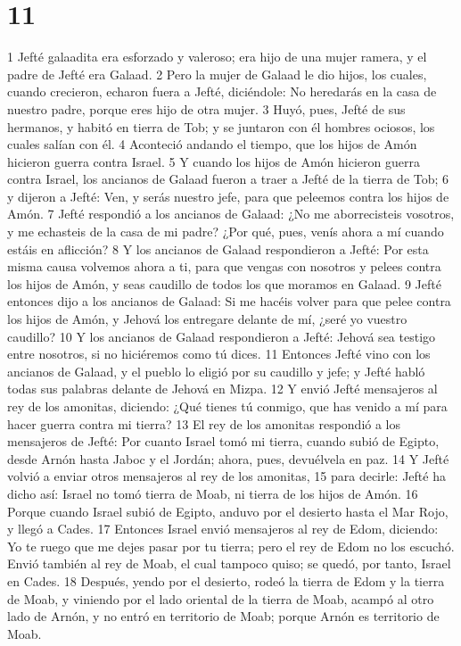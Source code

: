 \chapter{11}


1 Jefté galaadita era esforzado y valeroso; era hijo de una mujer ramera, y el padre de Jefté era Galaad.
2 Pero la mujer de Galaad le dio hijos, los cuales, cuando crecieron, echaron fuera a Jefté, diciéndole: No heredarás en la casa de nuestro padre, porque eres hijo de otra mujer.
3 Huyó, pues, Jefté de sus hermanos, y habitó en tierra de Tob; y se juntaron con él hombres ociosos, los cuales salían con él.
4 Aconteció andando el tiempo, que los hijos de Amón hicieron guerra contra Israel.
5 Y cuando los hijos de Amón hicieron guerra contra Israel, los ancianos de Galaad fueron a traer a Jefté de la tierra de Tob; 
6 y dijeron a Jefté: Ven, y serás nuestro jefe, para que peleemos contra los hijos de Amón.
7 Jefté respondió a los ancianos de Galaad: ¿No me aborrecisteis vosotros, y me echasteis de la casa de mi padre? ¿Por qué, pues, venís ahora a mí cuando estáis en aflicción?
8 Y los ancianos de Galaad respondieron a Jefté: Por esta misma causa volvemos ahora a ti, para que vengas con nosotros y pelees contra los hijos de Amón, y seas caudillo de todos los que moramos en Galaad.
9 Jefté entonces dijo a los ancianos de Galaad: Si me hacéis volver para que pelee contra los hijos de Amón, y Jehová los entregare delante de mí, ¿seré yo vuestro caudillo?
10 Y los ancianos de Galaad respondieron a Jefté: Jehová sea testigo entre nosotros, si no hiciéremos como tú dices.
11 Entonces Jefté vino con los ancianos de Galaad, y el pueblo lo eligió por su caudillo y jefe; y Jefté habló todas sus palabras delante de Jehová en Mizpa.
12 Y envió Jefté mensajeros al rey de los amonitas, diciendo: ¿Qué tienes tú conmigo, que has venido a mí para hacer guerra contra mi tierra?
13 El rey de los amonitas respondió a los mensajeros de Jefté: Por cuanto Israel tomó mi tierra, cuando subió de Egipto, desde Arnón hasta Jaboc y el Jordán; ahora, pues, devuélvela en paz.
14 Y Jefté volvió a enviar otros mensajeros al rey de los amonitas,
15 para decirle: Jefté ha dicho así: Israel no tomó tierra de Moab, ni tierra de los hijos de Amón.
16 Porque cuando Israel subió de Egipto, anduvo por el desierto hasta el Mar Rojo, y llegó a Cades.
17 Entonces Israel envió mensajeros al rey de Edom, diciendo: Yo te ruego que me dejes pasar por tu tierra; pero el rey de Edom no los escuchó. Envió también al rey de Moab, el cual tampoco quiso; se quedó, por tanto, Israel en Cades.
18 Después, yendo por el desierto, rodeó la tierra de Edom y la tierra de Moab, y viniendo por el lado oriental de la tierra de Moab, acampó al otro lado de Arnón, y no entró en territorio de Moab; porque Arnón es territorio de Moab.
